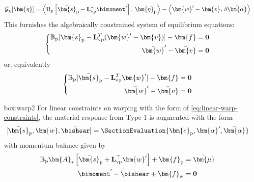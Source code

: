 \begin{equation}
\mathcal{G}_{\chi}[\bm{\eta}] = 
\left< \operatorname{B}_{\rm p} \left[\bar{\bm{s}}_{\rm p} - \mathbf{L}_{\rm vp}^* \bimoment' \right],\,  \bm{\eta}_{\rm p} \right>
-\left< {\bm{w}}'-{\bm{v}} ,\, \delta \bar{\bm{\alpha}} \right>
\end{equation}
This furnishes the algebraically constrained system of equilibrium equations:
\begin{equation*}
\left\{
\begin{aligned}
\mathbb{B}_{\rm p}[{\bm{s}}_{\rm p} - \mathbf{L}^T_{\rm vp}(\bm{w}' - \bm{v})] - \bm{f} &=\mathbf{0} \\
\bar{\bm{w}}' - \bar{\bm{v}} &= \mathbf{0} \\
\end{aligned}
\right.
\end{equation*}
or, equivalently
\begin{equation}
\left\{
\begin{aligned}
\mathbb{B}_{\rm p}[\bar{\bm{s}}_{\rm p} - \mathbf{L}^T_{\rm vp}\bm{w}'] - \bm{f} &=\mathbf{0} \\
\bar{\bm{w}}' - \bar{\bm{v}} &= \mathbf{0} \\
\end{aligned}
\right.
\label{eq:constrain-equilibrium-algebraic}
\end{equation}


\vspace{1ex}
\begin{ambox}{box:warp2}
For linear constraints on warping with the form of \eqref{eq:linear-warp-constraints}, the material response from Type 1 is augmented with the form
\[
[\bar{\bm{s}}_{\mathrm{p}},\bm{w},\bar{\bishear}] = \SectionEvaluation{
\bm{e}_{\mathrm{p}}, \bm{\alpha}', \bar{\bm{\alpha}}
}
\]
with momentum balance given by
\begin{equation}
\begin{aligned}
    \mathbb{B}_{\rm p} \bm{A}_* \left[\bar{\bm{s}}_{\mathrm{p}} + \mathbf{L}_{\rm vp}^{\top}\bm{w}'\right]+ \bm{f}_{\mathrm{p}} &= \dot{\bm{\mu}} \\ 
    \bar{\bimoment}' - \bar{\bishear} + \bm{f}_{\mathrm{w}} &= \mathbf{0}
\end{aligned}
\label{eq:type2-equilibrium}
\end{equation}
\end{ambox}
